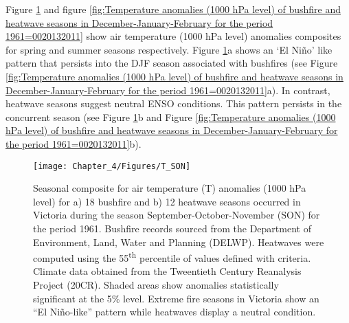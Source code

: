 Figure \ref{fig: Temperature anomalies (1000 hPa level) of bushfire and heatwave seasons in September-October-November for the period 1961=0020132011}
and figure \ref{fig:Temperature anomalies (1000 hPa level) of bushfire and heatwave seasons in December-January-February for the period 1961=0020132011}
show air temperature (1000 hPa level) anomalies composites for spring
and summer seasons respectively. Figure \ref{fig: Temperature anomalies (1000 hPa level) of bushfire and heatwave seasons in September-October-November for the period 1961=0020132011}a
shows an \textquoteleft El Ni\~no\textquoteright{} like pattern that
persists into the DJF season associated with bushfires (see Figure
\ref{fig:Temperature anomalies (1000 hPa level) of bushfire and heatwave seasons in December-January-February for the period 1961=0020132011}a).
In contrast, heatwave seasons suggest neutral ENSO conditions. This
pattern persists in the concurrent season (see Figure \ref{fig: Temperature anomalies (1000 hPa level) of bushfire and heatwave seasons in September-October-November for the period 1961=0020132011}b
and Figure \ref{fig:Temperature anomalies (1000 hPa level) of bushfire and heatwave seasons in December-January-February for the period 1961=0020132011}b). 

\begin{figure}[h]
\noindent \begin{centering}
\texttt{[image: Chapter\_4/Figures/T\_SON]}
\par\end{centering}

\caption[Seasonal composite for air temperature (T) anomalies (1000 hPa level)
for a) 18 bushfire and b) 12 heatwave seasons occurred in Victoria during the season
September-October-November (SON) for the period 1961]{Seasonal composite for air temperature (T) anomalies (1000 hPa level)
for a) 18 bushfire and b) 12 heatwave seasons occurred in Victoria during the season
September-October-November (SON) for the period 1961.
Bushfire records sourced from the Department of Environment, Land,
Water and Planning (DELWP). Heatwaves were computed using the 55\protect\textsuperscript{th}
percentile of values defined with \citet{Nairn2009} criteria. Climate
data obtained from the Tweentieth Century Reanalysis Project (20CR).
Shaded areas show anomalies statistically significant at the 5\% level.
Extreme fire seasons in Victoria show an ``El Ni\~no-like'' pattern
while heatwaves display a neutral condition. \label{fig: Temperature anomalies (1000 hPa level) of bushfire and heatwave seasons in September-October-November for the period 1961=0020132011}}


\end{figure}


